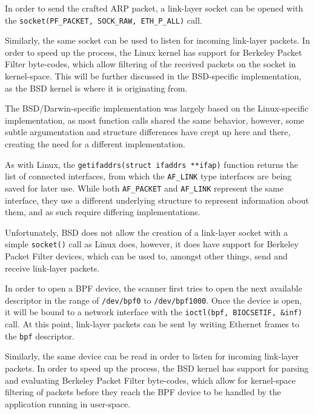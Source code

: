 \documentclass[a4paper,12pt]{article}
\begin{document}
	In order to send the crafted ARP packet, a link-layer socket can be opened with the \texttt{socket(PF_PACKET, SOCK_RAW, ETH_P_ALL)} call.
	
	Similarly, the same socket can be used to listen for incoming link-layer packets. In order to speed up the process, the Linux kernel has support for Berkeley Packet Filter byte-codes, which allow filtering of the received packets on the socket in kernel-space. This will be further discussed in the BSD-specific implementation, as the BSD kernel is where it is originating from.

 

	The BSD/Darwin-specific implementation was largely based on the Linux-specific implementation, as most function calls shared the same behavior, however, some subtle argumentation and structure differences have crept up here and there, creating the need for a different implementation.

	As with Linux, the \texttt{getifaddrs(struct ifaddrs **ifap)} function returns the list of connected interfaces, from which the \texttt{AF_LINK} type interfaces are being saved for later use. While both \texttt{AF_PACKET} and \texttt{AF_LINK} represent the same interface, they use a different underlying structure to represent information about them, and as such require differing implementations.
	
	Unfortunately, BSD does not allow the creation of a link-layer socket with a simple \texttt{socket()} call as Linux does, however, it does have support for Berkeley Packet Filter devices, which can be used to, amongst other things, send and receive link-layer packets.
	
	In order to open a BPF device, the scanner first tries to open the next available descriptor in the range of \texttt{/dev/bpf0} to \texttt{/dev/bpf1000}. Once the device is open, it will be bound to a network interface with the \texttt{ioctl(bpf, BIOCSETIF, &inf)} call. At this point, link-layer packets can be sent by writing Ethernet frames to the \texttt{bpf} descriptor.
	
	Similarly, the same device can be read in order to listen for incoming link-layer packets. In order to speed up the process, the BSD kernel has support for parsing and evaluating Berkeley Packet Filter byte-codes, which allow for kernel-space filtering of packets before they reach the BPF device to be handled by the application running in user-space.
	
\end{document}
